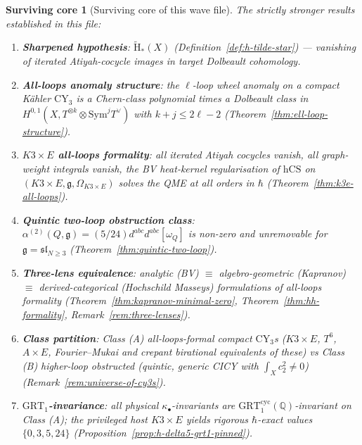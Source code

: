 \documentclass[11pt]{article}
\newtheorem{surviving}[theorem]{Surviving core}
\providecommand{\CY}{\mathrm{CY}}
\providecommand{\hCS}{\mathrm{hCS}}
\providecommand{\Om}{\Omega}
\providecommand{\Sym}{\mathrm{Sym}}
\providecommand{\fg}{\mathfrak{g}}
\providecommand{\QQ}{\mathbb{Q}}
\providecommand{\GRT}{\mathrm{GRT}}
\begin{document}
\begin{surviving}[Surviving core of this wave file]
\label{surv:wave-file-surviving-core}
The strictly stronger results established in this file:
\begin{enumerate}[label=\textup{(\arabic*)}]
\item \textbf{Sharpened hypothesis}:  $\widetilde{\mathrm{H}}_*(X)$
(Definition~\ref{def:h-tilde-star}) --- vanishing of iterated
Atiyah-cocycle images in target Dolbeault cohomology.
\item \textbf{All-loops anomaly structure}:  the $\ell$-loop
wheel anomaly on a compact K\"ahler $\CY_3$ is a Chern-class
polynomial times a Dolbeault class in
$H^{0,1}(X, T^{\otimes k} \otimes \Sym^j T^\vee)$ with
$k + j \leq 2\ell - 2$ (Theorem~\ref{thm:ell-loop-structure}).
\item \textbf{$K3 \times E$ all-loops formality}: all iterated
Atiyah cocycles vanish, all graph-weight integrals vanish, the
BV heat-kernel regularisation of $\hCS$ on $(K3 \times E, \fg,
\Om_{K3\times E})$ solves the QME at all orders in $\hbar$
(Theorem~\ref{thm:k3e-all-loops}).
\item \textbf{Quintic two-loop obstruction class}:
$\alpha^{(2)}(Q, \fg) = (5/24) d^{abc} d^{abc} [\omega_Q]$
is non-zero and unremovable for $\fg = \mathfrak{sl}_{N\geq 3}$
(Theorem~\ref{thm:quintic-two-loop}).
\item \textbf{Three-lens equivalence}: analytic (BV) $\equiv$
algebro-geometric (Kapranov) $\equiv$ derived-categorical
(Hochschild Masseys) formulations of all-loops formality
(Theorem~\ref{thm:kapranov-minimal-zero},
Theorem~\ref{thm:hh-formality}, Remark~\ref{rem:three-lenses}).
\item \textbf{Class partition}: Class (A) all-loops-formal compact
$\CY_3$s ($K3 \times E$, $T^6$, $A \times E$, Fourier--Mukai and
crepant birational equivalents of these) vs Class (B)
higher-loop obstructed (quintic, generic CICY with
$\int_X c_2^2 \neq 0$) (Remark~\ref{rem:universe-of-cy3s}).
\item \textbf{$\GRT_1$-invariance}: all physical $\kappa_\bullet$-invariants
are $\GRT_1^{\mathrm{cyc}}(\QQ)$-invariant on Class (A);  the
privileged host $K3 \times E$ yields rigorous $\hbar$-exact values
$\{0, 3, 5, 24\}$ (Proposition~\ref{prop:h-delta5-grt1-pinned}).
\end{enumerate}
\end{surviving}
\end{document}
